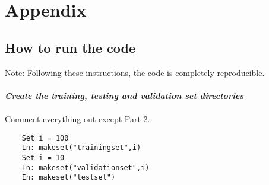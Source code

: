 \documentclass{article}
\begin{document}
\clearpage




\appendix
\section{Appendix}
\subsection{How to run the code}

\color{blue}
Note: Following these instructions, the code is completely reproducible. 
\color{black}\\ \\
\noindent \textit{\textbf{Create the training, testing and validation set directories}}
\\
\\
Comment everything out except Part 2.

\begin{verbatim}
    Set i = 100
    In: makeset("trainingset",i)
    Set i = 10
    In: makeset("validationset",i)
    In: makeset("testset")
\end{verbatim}
\end{document}
